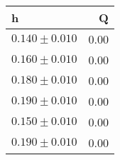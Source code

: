 \begin{tabular}{lr}
\toprule
h & Q \\
\midrule
$0.140 \pm 0.010$ & 0.00 \\
$0.160 \pm 0.010$ & 0.00 \\
$0.180 \pm 0.010$ & 0.00 \\
$0.190 \pm 0.010$ & 0.00 \\
$0.150 \pm 0.010$ & 0.00 \\
$0.190 \pm 0.010$ & 0.00 \\
\bottomrule
\end{tabular}
